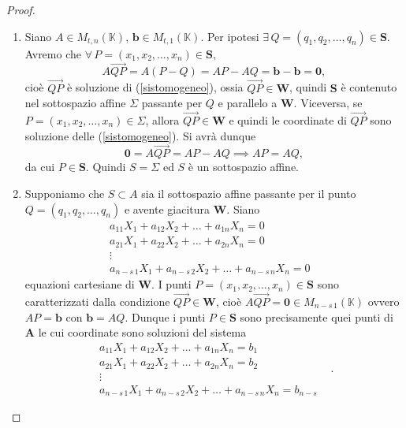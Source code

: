 \documentclass{article}
\theoremstyle{plain}
\theoremstyle{definition}
\theoremstyle{remark}
\begin{document}
\begin{proof}\hfill
    \begin{enumerate}
        \item Siano $A\in M_{t,n}(\mathbb{K})$, $\mathbf{b}\in M_{t,1}(\mathbb{K})$. 
        Per ipotesi $\exists\,Q=(q_1,q_2,\ldots,q_n)\in\mathbf{S}$. 
        Avremo che $\forall\,P=(x_1,x_2,\ldots,x_n)\in\mathbf{S},$
        \[A\overrightarrow{QP}=A(P-Q)=AP-AQ=\mathbf{b}-\mathbf{b}=\mathbf{0},\]
        cioè $\overrightarrow{QP}$ è soluzione di (\ref{sistomogeneo}), ossia $\overrightarrow{QP}\in\mathbf{W}$, quindi $\mathbf{S}$ è contenuto nel sottospazio affine $\Sigma$
        passante per $Q$ e parallelo a $\mathbf{W}$. 
        Viceversa, se $P=(x_1,x_2,\ldots,x_n)\in\Sigma$, allora $\overrightarrow{QP}\in\mathbf{W}$ e quindi le coordinate di $\overrightarrow{QP}$ sono soluzione delle (\ref{sistomogeneo}).
        Si avrà dunque
        \[\mathbf{0}=A\overrightarrow{QP}=AP-AQ\implies AP=AQ,\]
        da cui $P\in\mathbf{S}$. Quindi $S=\Sigma$ ed $S$ è un sottospazio affine.
        \item Supponiamo che $S\subset A$ sia il sottospazio affine passante per il punto $Q=(q_1,q_2,\ldots,q_n)$ e avente giacitura $\mathbf{W}$.
        Siano 
        \[\begin{array}{rcl}
            a_{11}X_1+a_{12}X_2+\ldots+a_{1n}X_n=0&\\
            a_{21}X_1+a_{22}X_2+\ldots+a_{2n}X_n=0&\\
             \vdots& \\
            a_{n-s\,1}X_1+a_{n-s\,2}X_2+\ldots+a_{n-s\,n}X_n=0&
        \end{array}\]
        equazioni cartesiane di $\mathbf{W}$. I punti $P=(x_1,x_2,\ldots,x_n)\in\mathbf{S}$ sono caratterizzati dalla condizione $\overrightarrow{QP}\in\mathbf{W}$, cioè
        $A\overrightarrow{QP}=\mathbf{0}\in M_{n-s\,1}(\mathbb{K})$ ovvero $AP=\mathbf{b}$ con $\mathbf{b}=AQ$.
        Dunque i punti $P\in\mathbf{S}$ sono precisamente quei punti di $\mathbf{A}$ le cui coordinate sono soluzioni del sistema
        \[\begin{array}{rcl}
            a_{11}X_1+a_{12}X_2+\ldots+a_{1n}X_n=b_1&\\
            a_{21}X_1+a_{22}X_2+\ldots+a_{2n}X_n=b_2&\\
             \vdots& \\
            a_{n-s\,1}X_1+a_{n-s\,2}X_2+\ldots+a_{n-s\,n}X_n=b_{n-s}&
        \end{array}.\]
    \end{enumerate}
\end{proof}
\end{document}
